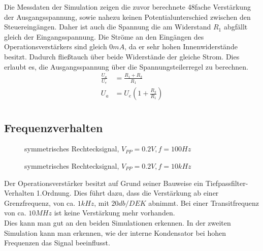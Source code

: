 Die Messdaten der Simulation zeigen die zuvor berechnete 48fache Verstärkung der Ausgangsspannung, sowie nahezu keinen Potentialunterschied zwischen den Steuereingängen.
Daher ist auch die Spannung die am Widerstand $R_1$ abgfällt gleich der Eingangsspannung. Die Ströme an den Eingängen des Operationsverstärkers sind gleich $0mA$, da er
sehr hohen Innenwiderstände besitzt. Dadurch fließtauch über beide Widerstände der gleiche Strom. Dies erlaubt es, die Ausgangsspannung über die Spannungsteilerregel zu
berechnen.\\

\begin{align*}
 \frac{U_a}{U_e} &= \frac{R_1 + R_2}{R_1}\\
 U_a &= U_e \left( 1+\frac{R_2}{R_1} \right)\\
\end{align*}

\subsection{Frequenzverhalten}

\begin{figure}[H]
  \centering
  \caption{symmetrisches Rechtecksignal, $V_{PP}=0.2V, f=100Hz$}
\end{figure}

\begin{figure}[H]
  \centering
  \caption{symmetrisches Rechtecksignal, $V_{PP}=0.2V, f=10kHz$}
\end{figure}

Der Operationsverstärker besitzt auf Grund seiner Bauweise ein Tiefpassfilter-Verhalten 1.Ordnung. Dies führt dazu, dass die Verstärkung ab einer Grenzfrequenz,
von ca. $1kHz$, mit $20db/DEK$ abnimmt. Bei einer Transitfrequenz von ca. $10MHz$ ist keine Verstärkung mehr vorhanden.\\
Dies kann man gut an den beiden Simulationen erkennen. In der zweiten Simulation kann man erkennen, wie der interne Kondensator bei hohen Frequenzen das Signal
beeinflusst.\\
